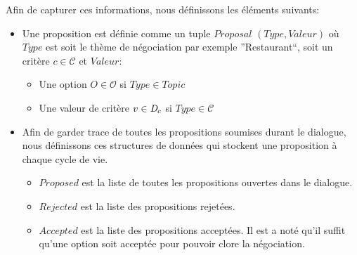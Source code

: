 \documentclass [french]{sig-alternate-05-2015}
\begin{document}
Afin de capturer ces informations, nous définissons les éléments suivants:
\begin{itemize}
	\item Une proposition est définie comme un tuple $Proposal$ $(Type, Valeur)$ où $Type$ est soit le thème de négociation par exemple ''Restaurant``, soit un critère $c \in \mathcal{C}$ et $Valeur$:
	\begin{itemize}
			\item Une option $O \in \mathcal{O}$ si $Type \in Topic$ 
			\item Une valeur de critère $v \in \emph{D}_c$ si $Type \in \mathcal{C}$
	\end{itemize}

	\item Afin de garder trace de toutes les propositions soumises durant le dialogue, nous définissons ces structures de données qui stockent une proposition à chaque cycle de vie. 
		\begin{itemize}
			\item $ Proposed$ est la liste de toutes les propositions ouvertes dans le dialogue.
			\item $ Rejected$  est la liste des propositions rejetées.
			\item $ Accepted$  est la liste des propositions acceptées. Il est a noté qu'il suffit qu'une option soit acceptée pour pouvoir clore la négociation. 
		\end{itemize}
\end{itemize}
\end{document}
